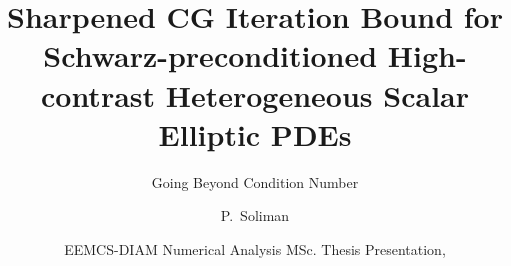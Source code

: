 \documentclass[t, aspectratio=169, english, table]{style/tudelft-beamer}
\title[]{Sharpened CG Iteration Bound for Schwarz-preconditioned High-contrast Heterogeneous Scalar Elliptic PDEs}
\subtitle{Going Beyond Condition Number}
\author[]{P.~Soliman\inst{1}}
\institute[University]{
  \strut\llap{\inst{1}\,}Delft University of Technology
}
\date[EEMCS-DIAM-NA MSc. Thesis \monthyeardate]{EEMCS-DIAM Numerical Analysis MSc. Thesis Presentation, \monthyeardate}
\begin{document}
\titleframe














\end{document}
